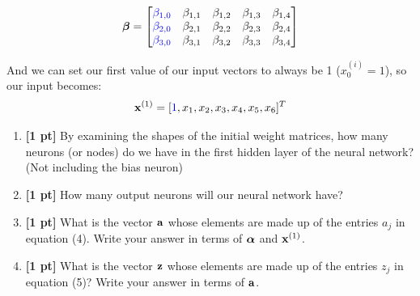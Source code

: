 \begin{enumerate}
$$\boldsymbol{\beta}=
    \begin{bmatrix}
    \textcolor{blue}{\beta_{1,0}} & \beta_{1,1} & \beta_{1,2} & \beta_{1,3} & \beta_{1,4} \\
    \textcolor{blue}{\beta_{2,0}} & \beta_{2,1} & \beta_{2,2} & \beta_{2,3} & \beta_{2,4} \\
    \textcolor{blue}{\beta_{3,0}} & \beta_{3,1} & \beta_{3,2} & \beta_{3,3} & \beta_{3,4}
    \end{bmatrix}$$

    And we can set our first value of our input vectors to always be 1 ($x_0^{(i)} = 1$), so our input becomes: $$\mathbf{x}^{(1)}=[\textcolor{blue}{1},x_1,x_2,x_3,x_4,x_5,x_6]^T$$
    
    
    \begin{enumerate}
        \item \textbf{[1 pt]} By examining the shapes of the initial weight matrices, how many neurons (or nodes) do we have in the first hidden layer of the neural network? (Not including the bias neuron)
        
        \begin{tcolorbox}[fit,height=1cm, width=2cm, blank, borderline={1pt}{-2pt}]
        \end{tcolorbox}

        
        
        
        \item \textbf{[1 pt]} How many output neurons will our neural network have?
        
        \begin{tcolorbox}[fit,height=1cm, width=2cm, blank, borderline={1pt}{-2pt}]
        \end{tcolorbox}

        
        
        
        
        \item \textbf{[1 pt]} What is the vector $\mathbf{a}$ whose elements are made up of the entries $a_j$ in equation (4). Write your answer in terms of $\boldsymbol \alpha$ and $\mathbf{x}^{(1)}$.
        
        
        \begin{tcolorbox}[fit,height=1cm, width=4cm, blank, borderline={1pt}{-2pt}]
        \end{tcolorbox}
        
        
        
        
        \item \textbf{[1 pt]} What is the vector $\mathbf{z}$ whose elements are made up of the entries $z_j$ in equation (5)? Write your answer in terms of $\mathbf{a}$.
        

\end{enumerate}
\end{enumerate}
